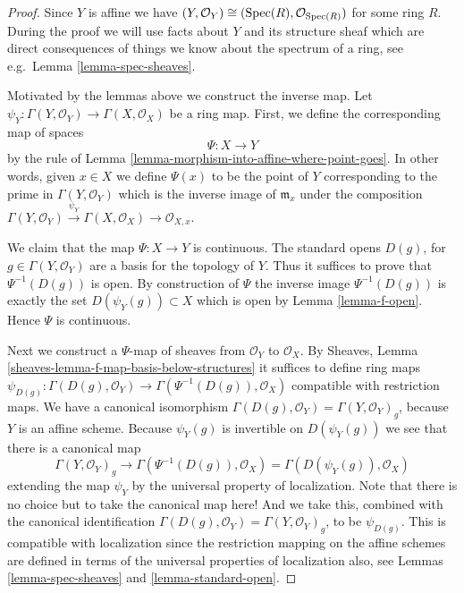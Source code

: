 \begin{proof}
Since $Y$ is affine we have
$(Y, \mathcal{O}_Y) \cong (\mathop{\mathrm{Spec}}(R), \mathcal{O}_{\mathop{\mathrm{Spec}}(R)})$
for some ring $R$.
During the proof we will use facts about $Y$ and
its structure sheaf which are direct consequences of things
we know about the spectrum of a ring, see e.g.\ Lemma
\ref{lemma-spec-sheaves}.

\medskip\noindent
Motivated by the lemmas above we construct the inverse map.
Let $\psi_Y : \Gamma(Y, \mathcal{O}_Y) \to \Gamma(X, \mathcal{O}_X)$
be a ring map. First, we define the corresponding map of
spaces
$$
\Psi : X \longrightarrow Y
$$
by the rule of
Lemma \ref{lemma-morphism-into-affine-where-point-goes}.
In other words, given $x \in X$ we define $\Psi(x)$
to be the point of $Y$ corresponding to the prime
in $\Gamma(Y, \mathcal{O}_Y)$ which is the inverse
image of $\mathfrak m_x$ under the composition
$
\Gamma(Y, \mathcal{O}_Y) \xrightarrow{\psi_Y}
\Gamma(X, \mathcal{O}_X) \to
\mathcal{O}_{X, x}
$.

\medskip\noindent
We claim that the map $\Psi : X \to Y$ is continuous.
The standard opens $D(g)$, for $g \in \Gamma(Y, \mathcal{O}_Y)$
are a basis for the topology of $Y$. Thus it suffices to prove
that $\Psi^{-1}(D(g))$ is open. By construction of $\Psi$
the inverse image $\Psi^{-1}(D(g))$ is exactly the set
$D(\psi_Y(g)) \subset X$ which is open by Lemma \ref{lemma-f-open}.
Hence $\Psi$ is continuous.

\medskip\noindent
Next we construct a $\Psi$-map of sheaves from
$\mathcal{O}_Y$ to $\mathcal{O}_X$. By
Sheaves, Lemma \ref{sheaves-lemma-f-map-basis-below-structures}
it suffices to define ring maps
$\psi_{D(g)} : \Gamma(D(g), \mathcal{O}_Y) \to
\Gamma(\Psi^{-1}(D(g)), \mathcal{O}_X)$
compatible with restriction maps.
We have a canonical isomorphism
$\Gamma(D(g), \mathcal{O}_Y) = \Gamma(Y, \mathcal{O}_Y)_g$,
because $Y$ is an affine scheme.
Because $\psi_Y(g)$ is invertible on $D(\psi_Y(g))$
we see that there is a canonical map
$$
\Gamma(Y, \mathcal{O}_Y)_g
\longrightarrow
\Gamma(\Psi^{-1}(D(g)), \mathcal{O}_X)
=
\Gamma(D(\psi_Y(g)), \mathcal{O}_X)
$$
extending the map $\psi_Y$
by the universal property of localization.
Note that there is no choice but to take the canonical map here!
And we take this, combined
with the canonical identification
$\Gamma(D(g), \mathcal{O}_Y) = \Gamma(Y, \mathcal{O}_Y)_g$, to
be $\psi_{D(g)}$. This is compatible with localization since the
restriction mapping on the affine schemes are defined in terms
of the universal properties of localization also, see
Lemmas \ref{lemma-spec-sheaves} and \ref{lemma-standard-open}.


\end{proof}
